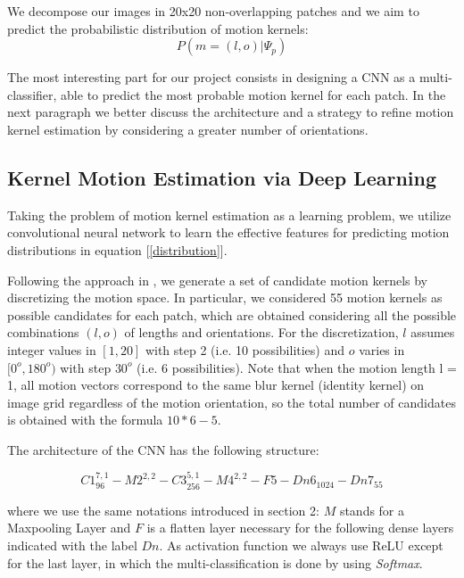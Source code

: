 \documentclass[12pt,a4paper]{article}
\begin{document}
We decompose our images in 20x20 non-overlapping patches and we aim to predict the probabilistic distribution of motion kernels: 
\begin{equation}
P(m = (l, o)|\Psi_p)
\label{distribution}
\end{equation}

The most interesting part for our project consists in designing a CNN as a multi-classifier, able to predict the most probable motion kernel for each patch. In the next paragraph we better discuss the architecture and a strategy to refine motion kernel estimation by considering a greater number of orientations. 

\subsection{Kernel Motion Estimation via Deep Learning}

Taking the problem of motion kernel estimation as a learning problem, we utilize convolutional neural network to learn the effective features for predicting motion distributions in equation [\ref{distribution}].

Following the approach in \cite{S&Al}, we generate a set of candidate motion kernels by discretizing the motion space. In particular, we considered 55 motion kernels as possible candidates for each patch, which are obtained considering all the possible combinations $(l,o)$ of lengths and orientations. For the discretization, $l$ assumes integer values in $[1,20]$ with step 2 (i.e. 10 possibilities) and $o$ varies in $[0^o, 180^o)$ with step $30^o$ (i.e. 6 possibilities). Note that when
the motion length l = 1, all motion vectors correspond to
the same blur kernel (identity kernel) on image grid regardless of the motion orientation, so the total number of candidates is obtained with the formula $10*6-5$. 

The architecture of the CNN has the following structure:

\begin{equation}
C1_{96}^{7,1} - M2^{2,2} - C3_{256}^{5,1} - M4^{2,2} - F5 - Dn6_{1024} - Dn7_{55}
\end{equation}

where we use the same notations introduced in section 2: $M$ stands for a Maxpooling Layer and $F$ is a flatten layer necessary for the following dense layers indicated with the label $Dn$. As activation function we always use ReLU except for the last layer, in which the multi-classification is done by using \textit{Softmax}.
\end{document}
